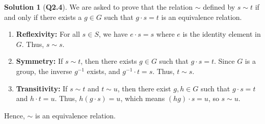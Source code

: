 \documentclass{article}
\theoremstyle{definition}
\newtheorem*{sol}{Solution}
\begin{document}
\begin{sol}[\textbf{Q2.4}]
	We are asked to prove that the relation $\sim$ defined by $s \sim t$ if and only if there exists a $g \in G$ such that $g\cdot s = t$ is an equivalence relation.
	\begin{enumerate}
		\item \textbf{Reflexivity:} For all $s \in S$, we have $e\cdot s = s$ where $e$ is the identity element in $G$. Thus, $s \sim s$.
		\item \textbf{Symmetry:} If $s \sim t$, then there exists $g \in G$ such that $g\cdot s = t$. Since $G$ is a group, the inverse $g^{-1}$ exists, and $g^{-1}\cdot t = s$. Thus, $t \sim s$.
		\item \textbf{Transitivity:} If $s \sim t$ and $t \sim u$, then there exist $g, h \in G$ such that $g\cdot s = t$ and $h\cdot t = u$. Thus, $h(g\cdot s) = u$, which means $(hg)\cdot s = u$, so $s \sim u$.
	\end{enumerate}
	Hence, $\sim$ is an equivalence relation.
\end{sol}
\end{document}
